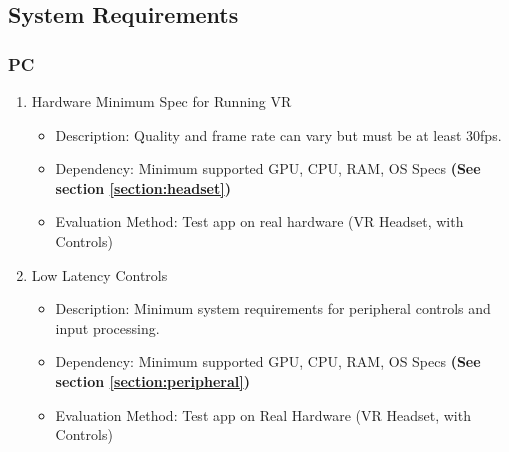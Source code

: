 \documentclass[a4paper,10pt]{article}
\begin{document}
	\subsection{System Requirements}
	\subsubsection{PC}
		\begin{enumerate}
			\item Hardware Minimum Spec for Running VR
			\begin{itemize}
				\item Description: Quality and frame rate can vary but must be at least 30fps.
				\item Dependency: Minimum supported GPU, CPU, RAM, OS Specs \textbf{(See section \ref{section:headset})}
				\item Evaluation Method: Test app on real hardware (VR Headset, with Controls)
			\end{itemize}
			\item Low Latency Controls
			\begin{itemize}
				\item Description: Minimum system requirements for peripheral controls and input processing.
				\item Dependency: Minimum supported GPU, CPU, RAM, OS Specs \textbf{(See section \ref{section:peripheral})}
				\item Evaluation Method: Test app on Real Hardware (VR Headset, with Controls)
			\end{itemize}
		\end{enumerate}
\end{document}
